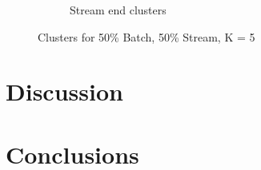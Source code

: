 \documentclass{lmproj}
\begin{document}
\begin{figure}[H]
\begin{subfigure}{.5\textwidth}
		\caption*{Stream end clusters}
		\label{fig:stream_50_50_k_5_end}
	\end{subfigure}
	\caption{Clusters for 50\% Batch, 50\% Stream, K = 5}
	\label{fig:clusters_k_5_50_50}
\end{figure}



\section{Discussion}
\label{evaluation}


\section{Conclusions}
\label{conclusions}




\nocite{*}
\end{document}
